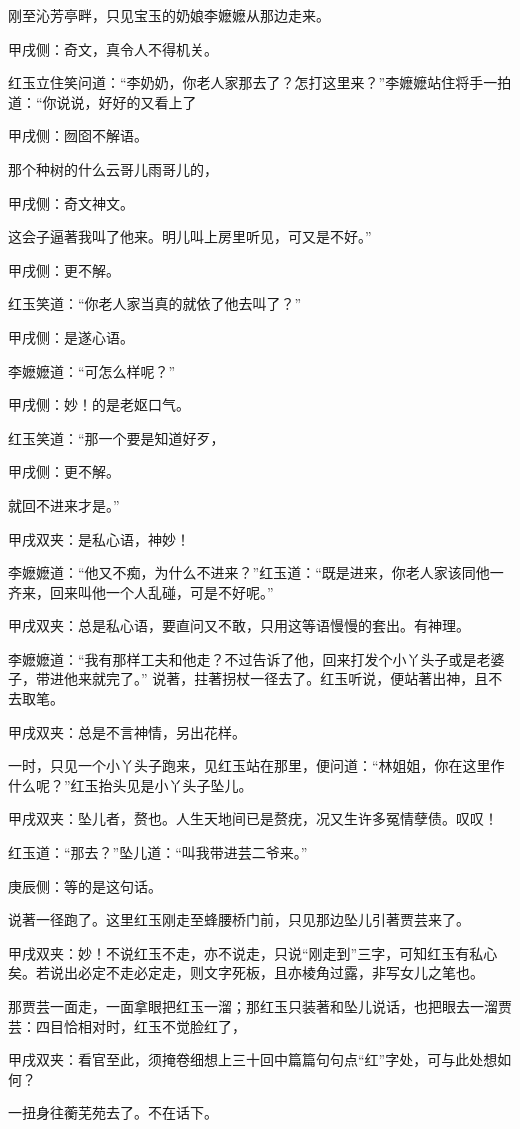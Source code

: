 \begin{parag}
    刚至沁芳亭畔，只见宝玉的奶娘李嬷嬷从那边走来。\begin{note}甲戌侧：奇文，真令人不得机关。\end{note}红玉立住笑问道：“李奶奶，你老人家那去了？怎打这里来？”李嬷嬷站住将手一拍道：“你说说，好好的又看上了\begin{note}甲戌侧：囫囵不解语。\end{note}那个种树的什么云哥儿雨哥儿的，\begin{note}甲戌侧：奇文神文。\end{note}这会子逼著我叫了他来。明儿叫上房里听见，可又是不好。”\begin{note}甲戌侧：更不解。\end{note}红玉笑道：“你老人家当真的就依了他去叫了？”\begin{note}甲戌侧：是遂心语。\end{note}李嬷嬷道：“可怎么样呢？”\begin{note}甲戌侧：妙！的是老妪口气。\end{note}红玉笑道：“那一个要是知道好歹，\begin{note}甲戌侧：更不解。\end{note}就回不进来才是。”\begin{note}甲戌双夹：是私心语，神妙！\end{note}李嬷嬷道：“他又不痴，为什么不进来？”红玉道：“既是进来，你老人家该同他一齐来，回来叫他一个人乱碰，可是不好呢。”\begin{note}甲戌双夹：总是私心语，要直问又不敢，只用这等语慢慢的套出。有神理。\end{note}李嬷嬷道：“我有那样工夫和他走？不过告诉了他，回来打发个小丫头子或是老婆子，带进他来就完了。” 说著，拄著拐杖一径去了。红玉听说，便站著出神，且不去取笔。\begin{note}甲戌双夹：总是不言神情，另出花样。\end{note}
\end{parag}


\begin{parag}
    一时，只见一个小丫头子跑来，见红玉站在那里，便问道：“林姐姐，你在这里作什么呢？”红玉抬头见是小丫头子坠儿。\begin{note}甲戌双夹：坠儿者，赘也。人生天地间已是赘疣，况又生许多冤情孽债。叹叹！\end{note}红玉道：“那去？”坠儿道：“叫我带进芸二爷来。”\begin{note}庚辰侧：等的是这句话。\end{note}说著一径跑了。这里红玉刚走至蜂腰桥门前，只见那边坠儿引著贾芸来了。\begin{note}甲戌双夹：妙！不说红玉不走，亦不说走，只说“刚走到”三字，可知红玉有私心矣。若说出必定不走必定走，则文字死板，且亦棱角过露，非写女儿之笔也。\end{note}那贾芸一面走，一面拿眼把红玉一溜；那红玉只装著和坠儿说话，也把眼去一溜贾芸：四目恰相对时，红玉不觉脸红了，\begin{note}甲戌双夹：看官至此，须掩卷细想上三十回中篇篇句句点“红”字处，可与此处想如何？\end{note}一扭身往蘅芜苑去了。不在话下。
\end{parag}


